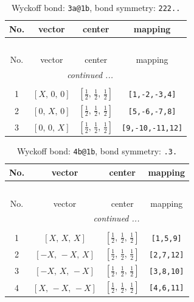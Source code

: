 \documentclass[fleqn,8pt]{jsarticle}
\begin{document}
\begin{longtable}{cccc}
\caption{Wyckoff bond: {\tt 3a@1b}, bond symmetry: {\tt 222..}}
 \\
 \hline \hline
No. & vector & center & mapping \\ \hline \endfirsthead

\multicolumn{3}{l}{\tablename\ \thetable{}} \\
 \hline \hline
No. & vector & center & mapping \\ \hline \endhead

 \hline \hline
\multicolumn{3}{r}{\footnotesize\it continued ...} \\ \endfoot

 \hline \hline
\multicolumn{3}{r}{} \\ \endlastfoot

1 & $\left[ X,\, 0,\, 0 \right]$ & $\left[ \frac{1}{2},\, \frac{1}{2},\, \frac{1}{2} \right]$ & {\tt [1,-2,-3,4]} \\ \hline
2 & $\left[ 0,\, X,\, 0 \right]$ & $\left[ \frac{1}{2},\, \frac{1}{2},\, \frac{1}{2} \right]$ & {\tt [5,-6,-7,8]} \\ \hline
3 & $\left[ 0,\, 0,\, X \right]$ & $\left[ \frac{1}{2},\, \frac{1}{2},\, \frac{1}{2} \right]$ & {\tt [9,-10,-11,12]} \\
\end{longtable}
\renewcommand{\arraystretch}{1.2}
\begin{longtable}{cccc}
\caption{Wyckoff bond: {\tt 4b@1b}, bond symmetry: {\tt .3.}}
 \\
 \hline \hline
No. & vector & center & mapping \\ \hline \endfirsthead

\multicolumn{3}{l}{\tablename\ \thetable{}} \\
 \hline \hline
No. & vector & center & mapping \\ \hline \endhead

 \hline \hline
\multicolumn{3}{r}{\footnotesize\it continued ...} \\ \endfoot

 \hline \hline
\multicolumn{3}{r}{} \\ \endlastfoot

1 & $\left[ X,\, X,\, X \right]$ & $\left[ \frac{1}{2},\, \frac{1}{2},\, \frac{1}{2} \right]$ & {\tt [1,5,9]} \\ \hline
2 & $\left[ - X,\, - X,\, X \right]$ & $\left[ \frac{1}{2},\, \frac{1}{2},\, \frac{1}{2} \right]$ & {\tt [2,7,12]} \\ \hline
3 & $\left[ - X,\, X,\, - X \right]$ & $\left[ \frac{1}{2},\, \frac{1}{2},\, \frac{1}{2} \right]$ & {\tt [3,8,10]} \\ \hline
4 & $\left[ X,\, - X,\, - X \right]$ & $\left[ \frac{1}{2},\, \frac{1}{2},\, \frac{1}{2} \right]$ & {\tt [4,6,11]} \\
\end{longtable}
\end{document}
